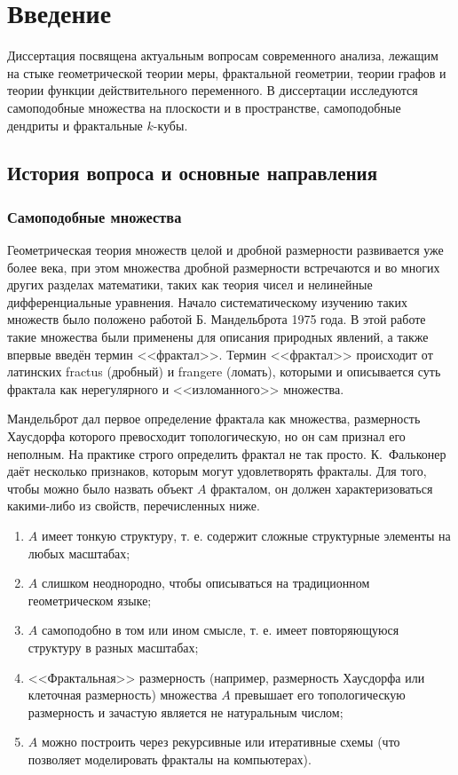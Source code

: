 \chapter*{Введение}                         %

Диссертация посвящена актуальным вопросам современного анализа, лежащим на стыке геометрической теории меры, фрактальной геометрии, теории графов и теории функции действительного переменного.
В диссертации исследуются самоподобные множества на плоскости и в пространстве, самоподобные дендриты и фрактальные $k$-кубы.



\section{История вопроса и основные направления}

\subsection{Самоподобные множества}

Геометрическая теория множеств целой и дробной размерности развивается уже более века, при этом множества дробной размерности встречаются и во многих других разделах математики, таких как теория чисел и нелинейные дифференциальные уравнения.
Начало систематическому изучению таких множеств было положено работой \cite{Man75} Б. Мандельброта 1975 года.
В этой работе такие множества были применены для описания природных  явлений, а также впервые введён термин <<фрактал>>.
Термин <<фрактал>> происходит от латинских fractus (дробный) и frangere (ломать), которыми и описывается суть фрактала как нерегулярного и <<изломанного>> множества.

Мандельброт дал первое определение фрактала как множества, размерность Хаусдорфа которого превосходит топологическую, но он сам признал его неполным.
На практике строго определить фрактал не так просто.
К.~Фальконер \cite{Falconer2004} даёт несколько признаков, которым могут удовлетворять фракталы.
Для того, чтобы можно было назвать объект $A$ фракталом, он должен характеризоваться какими-либо из свойств, перечисленных ниже.

\begin{enumerate}
\item $A$ имеет тонкую структуру, т. е. содержит сложные структурные элементы на любых масштабах;
\item $A$ слишком неоднородно, чтобы описываться на традиционном геометрическом языке;
\item $A$ самоподобно в том или ином смысле, т. е. имеет повторяющуюся структуру в разных масштабах;
\item <<Фрактальная>> размерность (например, размерность Хаусдорфа или клеточная размерность) множества $A$ превышает его топологическую размерность и зачастую является не натуральным числом;
\item $A$ можно построить через рекурсивные или итеративные схемы (что позволяет моделировать фракталы на компьютерах).
\end{enumerate}

